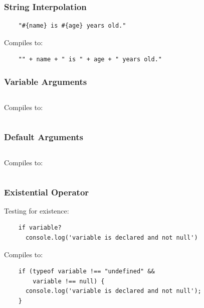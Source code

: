 \documentclass{beamer}
\begin{document}
\begin{frame}[fragile]
  \frametitle{String Interpolation}
 
  \begin{verbatim}
    "#{name} is #{age} years old."
  \end{verbatim}

  \pause
  \vspace{.5cm}
  Compiles to:
  \vspace{.5cm}

  \begin{verbatim}
    "" + name + " is " + age + " years old."
  \end{verbatim}  
\end{frame}

\begin{frame}
  \frametitle{Variable Arguments}

  \inputminted{coffeescript}{src/vararg.coffee}

  \pause
  \vspace{.5cm}
  Compiles to:
  \vspace{.5cm}

  \inputminted[fontsize=\tiny]{coffeescript}{src/vararg.js}
  
\end{frame}

\begin{frame}
\frametitle{Default  Arguments}

  \inputminted{coffeescript}{src/defvalues.coffee}

  \pause
  \vspace{.5cm}
  Compiles to:
  \vspace{.5cm}

  \inputminted[fontsize=\small]{coffeescript}{src/defvalues.js}


\end{frame}

%
%
 \begin{frame}[fragile]
  \frametitle{Existential Operator}

  Testing for existence:

  \begin{verbatim}
    if variable?
      console.log('variable is declared and not null')
  \end{verbatim}

  \pause
  \vspace{.5cm}
  Compiles to:
  \vspace{.5cm}


  \begin{verbatim}
    if (typeof variable !== "undefined" && 
        variable !== null) {
      console.log('variable is declared and not null');
    }
  \end{verbatim}  
\end{frame}
\end{document}
